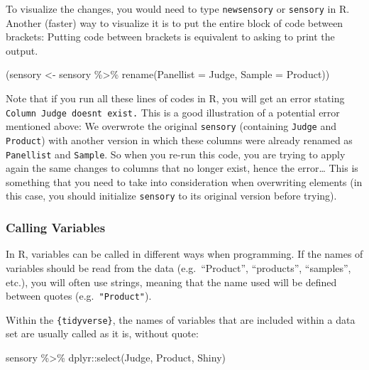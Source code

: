 \documentclass[
]{book}
\newenvironment{Shaded}{\begin{snugshade}}{\end{snugshade}}
\newcommand{\AttributeTok}[1]{\textcolor[rgb]{0.77,0.63,0.00}{#1}}
\newcommand{\FunctionTok}[1]{\textcolor[rgb]{0.00,0.00,0.00}{#1}}
\newcommand{\NormalTok}[1]{#1}
\newcommand{\OtherTok}[1]{\textcolor[rgb]{0.56,0.35,0.01}{#1}}
\newcommand{\SpecialCharTok}[1]{\textcolor[rgb]{0.00,0.00,0.00}{#1}}
\begin{document}
To visualize the changes, you would need to type \texttt{newsensory} or \texttt{sensory} in R.
Another (faster) way to visualize it is to put the entire block of code between brackets: Putting code between brackets is equivalent to asking to print the output.

\begin{Shaded}
\begin{Highlighting}[]
\NormalTok{(sensory }\OtherTok{\textless{}{-}}\NormalTok{ sensory }\SpecialCharTok{\%\textgreater{}\%} 
  \FunctionTok{rename}\NormalTok{(}\AttributeTok{Panellist =}\NormalTok{ Judge, }\AttributeTok{Sample =}\NormalTok{ Product))}
\end{Highlighting}
\end{Shaded}

Note that if you run all these lines of codes in R, you will get an error stating \texttt{Column\ \textquotesingle{}Judge\textquotesingle{}\ doesn\textquotesingle{}t\ exist.} This is a good illustration of a potential error mentioned above: We overwrote the original \texttt{sensory} (containing \texttt{Judge} and \texttt{Product}) with another version in which these columns were already renamed as \texttt{Panellist} and \texttt{Sample}. So when you re-run this code, you are trying to apply again the same changes to columns that no longer exist, hence the error\ldots{}
This is something that you need to take into consideration when overwriting elements (in this case, you should initialize \texttt{sensory} to its original version before trying).

\hypertarget{calling-variables}{%
\subsubsection{Calling Variables}\label{calling-variables}}

In R, variables can be called in different ways when programming. If the names of variables should be read from the data (e.g.~``Product'', ``products'', ``samples'', etc.), you will often use strings, meaning that the name used will be defined between quotes (e.g.~\texttt{"Product"}).

Within the \texttt{\{tidyverse\}}, the names of variables that are included within a data set are usually called as it is, without quote:

\begin{Shaded}
\begin{Highlighting}[]
\NormalTok{sensory }\SpecialCharTok{\%\textgreater{}\%} 
\NormalTok{  dplyr}\SpecialCharTok{::}\FunctionTok{select}\NormalTok{(Judge, Product, Shiny)}
\end{Highlighting}
\end{Shaded}
\end{document}
